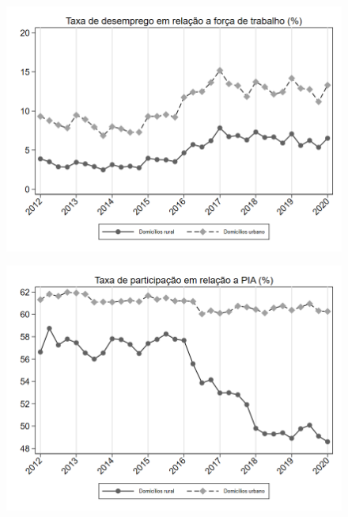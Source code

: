 \begin{frame}[label=_composicao_demografica_rural_urbano_taxa_de_desemprego]{}
\textit{\hyperlink{_composicao_demografica_rural_urbano}{}}
\begin{figure}
  \centering
  \includegraphics[width=1.0\linewidth]{../../analysis/output/composicao_demografica/area_geografica/_composicao_demografica_rural_urbano_taxa_de_desemprego.png}
  \caption{}
  \label{fig:_composicao_demografica_rural_urbano_taxa_de_desemprego}
\end{figure}
\end{frame}

\begin{frame}[label=_composicao_demografica_rural_urbano_taxa_de_participacao]{}
\textit{\hyperlink{_composicao_demografica_rural_urbano}{}}
\begin{figure}
  \centering
  \includegraphics[width=1.0\linewidth]{../../analysis/output/composicao_demografica/area_geografica/_composicao_demografica_rural_urbano_taxa_de_participacao.png}
  \caption{}
  \label{fig:_composicao_demografica_rural_urbano_taxa_de_participacao}
\end{figure}
\end{frame}

